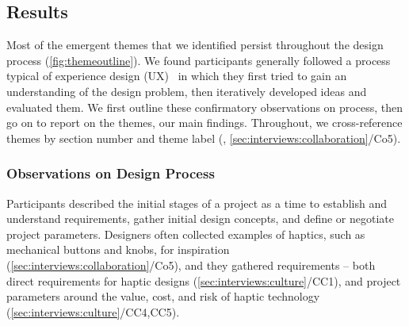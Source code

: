 
\subsection{Results}
\label{sec:interviews:process}
%
\noindent
Most of the emergent themes  that we identified persist throughout the design process (\autoref{fig:themeoutline}). %
We found participants generally followed a process typical of experience design (UX)~\citep{Buxton2007} %
in which they first tried to gain an understanding of the design problem, then iteratively developed ideas and evaluated them.
We first outline these confirmatory observations on process, then go on to  report on the themes, our main findings.
Throughout, we cross-reference themes by section number and theme label (\eg, \ref{sec:interviews:collaboration}/Co5).


\subsubsection{Observations on Design Process}
\noindent
Participants described the initial stages of a project as a time to establish and understand requirements, gather initial design concepts, and define or negotiate project parameters.
Designers often collected examples of haptics, such as mechanical buttons and knobs, for inspiration (\ref{sec:interviews:collaboration}/Co5), 
and  they gathered requirements -- both direct requirements for haptic designs (\ref{sec:interviews:culture}/CC1), and project parameters around the value, cost, and risk of haptic technology (\ref{sec:interviews:culture}/CC4,CC5).


